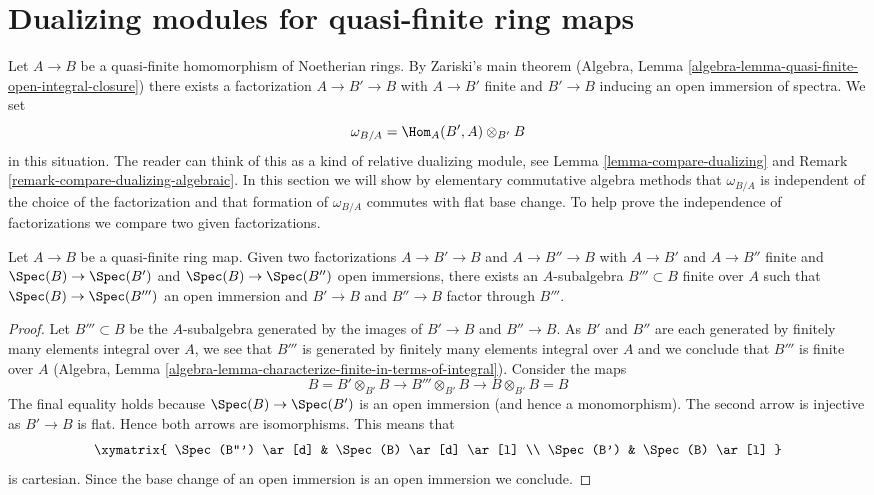 \section{Dualizing modules for quasi-finite ring maps}
\label{section-quasi-finite-dualizing}

\noindent
Let $A \to B$ be a quasi-finite homomorphism of Noetherian rings. By
Zariski's main theorem
(Algebra, Lemma \ref{algebra-lemma-quasi-finite-open-integral-closure})
there exists a factorization $A \to B' \to B$ with
$A \to B'$ finite and $B' \to B$ inducing an open immersion of spectra.
We set
\begin{equation}
\label{equation-dualizing}
\omega_{B/A} = \Hom_A(B', A) \otimes_{B'} B
\end{equation}
in this situation. The reader can think of this as a kind of relative
dualizing module, see Lemma \ref{lemma-compare-dualizing} and
Remark \ref{remark-compare-dualizing-algebraic}.
In this section we will show by elementary commutative algebra methods
that $\omega_{B/A}$ is independent of the choice of the factorization
and that formation of $\omega_{B/A}$ commutes with flat base change.
To help prove the independence of factorizations we compare two
given factorizations.

\begin{lemma}
\label{lemma-dominate-factorizations}
Let $A \to B$ be a quasi-finite ring map. Given two factorizations
$A \to B' \to B$ and $A \to B'' \to B$ with
$A \to B'$ and $A \to B''$ finite and $\Spec(B) \to \Spec(B')$
and $\Spec(B) \to \Spec(B'')$ open immersions, there exists
an $A$-subalgebra $B''' \subset B$ finite over $A$ such that
$\Spec(B) \to \Spec(B''')$ an open immersion and $B' \to B$ and
$B'' \to B$ factor through $B'''$.
\end{lemma}

\begin{proof}
Let $B''' \subset B$ be the $A$-subalgebra generated by the images
of $B' \to B$ and $B'' \to B$. As $B'$ and $B''$ are each generated
by finitely many elements integral over $A$, we see that $B'''$ is
generated by finitely many elements integral over $A$ and we conclude
that $B'''$ is finite over $A$
(Algebra, Lemma \ref{algebra-lemma-characterize-finite-in-terms-of-integral}).
Consider the maps
$$
B = B' \otimes_{B'} B \to B''' \otimes_{B'} B \to B \otimes_{B'} B = B
$$
The final equality holds because $\Spec(B) \to \Spec(B')$ is an
open immersion (and hence a monomorphism). The second arrow is injective
as $B' \to B$ is flat. Hence both arrows are isomorphisms.
This means that
$$
\xymatrix{
\Spec(B''') \ar[d] & \Spec(B) \ar[d] \ar[l] \\
\Spec(B') & \Spec(B) \ar[l]
}
$$
is cartesian. Since the base change of an open immersion is an
open immersion we conclude.
\end{proof}

